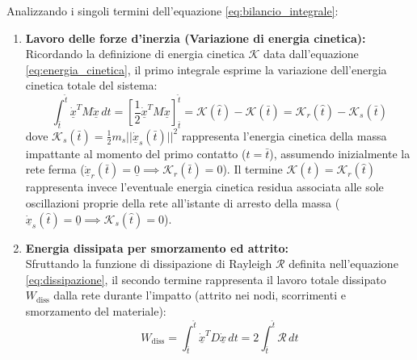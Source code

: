 Analizzando i singoli termini dell'equazione \eqref{eq:bilancio_integrale}:
\begin{enumerate}
  \item \textbf{Lavoro delle forze d'inerzia (Variazione di energia cinetica):}\\
  Ricordando la definizione di energia cinetica $\mathcal{K}$ data dall'equazione \eqref{eq:energia_cinetica}, il primo integrale esprime la variazione dell'energia cinetica totale del sistema:
  \begin{equation}
        \int_{\bar{t}}^{\hat{t}} \underline{\dot{x}}^T M \ddot{\underline{x}} \, dt = \left[ \frac{1}{2} \underline{\dot{x}}^T M \underline{\dot{x}} \right]_{\bar{t}}^{\hat{t}} = \mathcal{K}(\hat{t}) - \mathcal{K}(\bar{t}) = \mathcal{K}_r(\hat{t}) -\mathcal{K}_s(\bar{t})
    \end{equation}
  dove $\mathcal{K}_s(\bar{t}) = \frac{1}{2} m_{s} ||\dot{\underline{x}}_{s}(\bar{t})||^{2}$ rappresenta l'energia cinetica della massa impattante al momento del primo contatto ($t=\bar{t}$), assumendo inizialmente la rete ferma ($\underline{\dot{x}}_r(\bar{t}) = \underline{0} \implies \mathcal{K}_r(\bar{t}) = 0$). Il termine $\mathcal{K}(\hat{t}) = \mathcal{K}_{r}(\hat{t})$ rappresenta invece l'eventuale energia cinetica residua associata alle sole oscillazioni proprie della rete all'istante di arresto della massa ($\underline{\dot{x}}_{s}(\hat{t}) = \underline{0} \implies \mathcal{K}_{s}(\hat{t}) = 0$).
   
  \item \textbf{Energia dissipata per smorzamento ed attrito:}\\
    Sfruttando la funzione di dissipazione di Rayleigh $\mathcal{R}$ definita nell'equazione \eqref{eq:dissipazione}, il secondo termine rappresenta il lavoro totale dissipato $W_{\text{diss}}$ dalla rete durante l'impatto (attrito nei nodi, scorrimenti e smorzamento del materiale):
    \begin{equation}
        W_{\text{diss}} = \int_{\bar{t}}^{\hat{t}} \underline{\dot{x}}^T D \dot{\underline{x}} \, dt = 2 \int_{\bar{t}}^{\hat{t}} \mathcal{R} \, dt
    \end{equation}


\end{enumerate}
